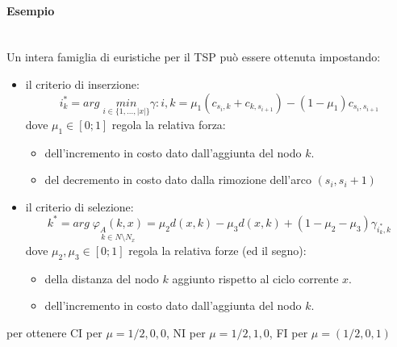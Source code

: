 \documentclass{article}
\begin{document}
\paragraph{Esempio}\mbox{}\\
Un intera famiglia di euristiche per il TSP può essere ottenuta impostando:
\begin{itemize}
    \item il criterio di inserzione:
    $$i^*_k=arg\;\underset{i\in\{1,\dots,|x|\}}{min}\gamma:{i,k}=\mu_1(c_{s_i,k}+c_{k,s_{i+1}})-(1-\mu_1)c_{s_i,s_{i+1}}$$
    dove $\mu_1\in[0;1]$ regola la relativa forza:
    \begin{itemize}
        \item dell'incremento in costo dato dall'aggiunta del nodo $k$.
        \item del decremento in costo dato dalla rimozione dell'arco $(s_i, s_i+1)$
    \end{itemize}
    \item il criterio di selezione:
    $$k^* = arg\;\underset{k\in N\setminus N_x}{\varphi_A(k,x)}= \mu_2 d(x,k)-\mu_3 d(x,k)+(1-\mu_2-\mu_3)\gamma_{i^*_k,k}$$
    dove $\mu_2,\mu_3\in[0;1]$ regola la relativa forze (ed il segno):
    \begin{itemize}
        \item della distanza del nodo $k$ aggiunto rispetto al ciclo corrente $x$.
        \item dell'incremento in costo dato dall'aggiunta del nodo $k$.
    \end{itemize}
\end{itemize}
per ottenere CI per $\mu={1/2,0,0}$, NI per $\mu={1/2,1,0}$, FI per $\mu=(1/2,0,1)$
\end{document}
